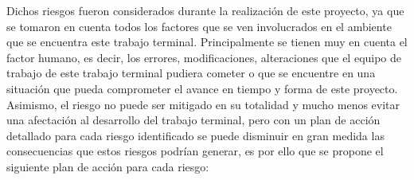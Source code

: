 Dichos riesgos fueron considerados durante la realización de este proyecto, ya que se tomaron en cuenta todos los factores que se ven involucrados en el ambiente que se encuentra este trabajo terminal. Principalmente se tienen muy en cuenta el factor humano, es decir, los errores, modificaciones, alteraciones que el equipo de trabajo de este trabajo terminal pudiera cometer o que se encuentre en una situación que pueda comprometer el avance en tiempo y forma de este proyecto.\\ 

Asimismo, el riesgo no puede ser mitigado en su totalidad y mucho menos evitar una afectación al desarrollo del trabajo terminal, pero con un plan de acción detallado para cada riesgo identificado se puede disminuir en gran medida las consecuencias que estos riesgos podrían generar, es por ello que se propone el siguiente plan de acción para cada riesgo: 


